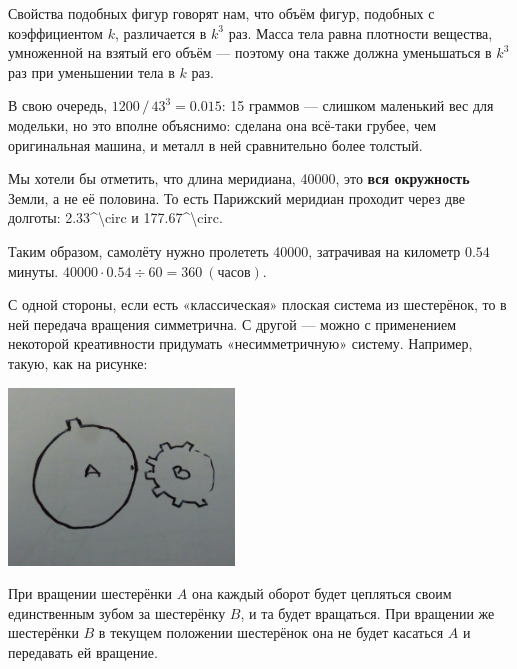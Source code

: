 \begin{itemize}
\itA Свойства подобных фигур говорят нам, что объём фигур, подобных с коэффициентом $k$, различается в $k^3$ раз. Масса тела равна плотности вещества, умноженной на взятый его объём — поэтому она также должна уменьшаться в $k^3$ раз при уменьшении тела в $k$ раз.

В свою очередь, $1200\,/\,43^3 = 0.015$: 15 граммов — слишком маленький вес для модельки, но это вполне объяснимо: сделана она всё-таки грубее, чем оригинальная машина, и металл в ней сравнительно более толстый.

\itB Мы хотели бы отметить, что длина меридиана, \SI{40000}{}, это {\bfseries вся окружность} Земли, а не её половина. То есть Парижский меридиан проходит через две долготы: \SI{2.33^\circ}{} и \SI{177.67^\circ}{}.

Таким образом, самолёту нужно пролететь \SI{40000}{}, затрачивая на километр $0.54$ минуты. $40000 \cdot 0.54 \div 60 = \SI{360}{(\text{часов})}$.

\itC С одной стороны, если есть «классическая» плоская система из шестерёнок, то в ней передача вращения симметрична. С другой — можно с применением некоторой креативности придумать «несимметричную» систему. Например, такую, как на рисунке:

\begin{center}
\includegraphics[natwidth=2560,natheight=2011,width=6cm]{figures/2018-models}
\end{center}

При вращении шестерёнки $A$ она каждый оборот будет цепляться своим единственным зубом за шестерёнку $B$, и та будет вращаться. При вращении же шестерёнки $B$ в текущем положении шестерёнок она не будет касаться $A$ и передавать ей вращение.

\end{itemize}